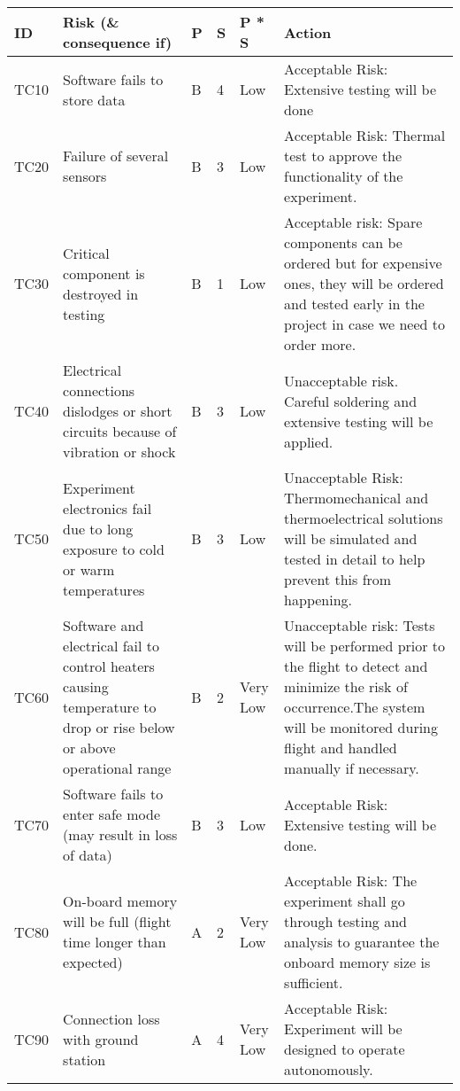 \begin{longtable}{|m{}| m{} |m{} |m{}|m{}| m{}|}

\hline
\textbf{ID} & \textbf{Risk (\& consequence if)} & \textbf{P} & \textbf{S} & \textbf{P * S} & \textbf{Action} \\ \hline
TC10 & Software fails to store data & B & 4 & \cellcolor[HTML]{FCFF2F}Low & Acceptable Risk: Extensive testing will be done \\ \hline
TC20 & Failure of several sensors & B & 3 & \cellcolor[HTML]{FCFF2F}Low & Acceptable Risk: Thermal test to approve the functionality of the experiment. \\ \hline
TC30 & Critical component is destroyed in testing & B & 1 & \cellcolor[HTML]{FCFF2F}Low & Acceptable risk: Spare components can be ordered but for expensive ones, they will be ordered and tested early in the project in case we need to order more. \\ \hline
TC40 & Electrical connections dislodges or short circuits because of vibration or shock & B & 3 & \cellcolor[HTML]{FCFF2F}Low & Unacceptable risk. Careful soldering and extensive testing will be applied. \\ \hline
TC50 & Experiment electronics fail due to long exposure to cold or warm temperatures & B & 3 & \cellcolor[HTML]{FCFF2F}Low & Unacceptable Risk: Thermomechanical and thermoelectrical solutions will be simulated and tested in detail to help prevent this from happening. \\ \hline
TC60 & Software and electrical fail to control heaters causing temperature to drop or rise below or above operational range & B & 2 & \cellcolor[HTML]{34FF34}Very Low & Unacceptable risk: Tests will be performed prior to the flight to detect and minimize the risk of occurrence.The system will be monitored during flight and handled manually if necessary. \\ \hline
TC70 & Software fails to enter safe mode (may result in loss of data) & B & 3 & \cellcolor[HTML]{FCFF2F}Low & Acceptable Risk: Extensive testing will be done. \\ \hline
TC80 & On-board memory will be full (flight time longer than expected) & A & 2 & \cellcolor[HTML]{34FF34}Very Low & Acceptable Risk: The experiment shall go through testing and analysis to guarantee the onboard memory size is sufficient.\\ \hline
TC90 & Connection loss with ground station & A & 4 & \cellcolor[HTML]{34FF34}Very Low & Acceptable Risk: Experiment will be designed to operate autonomously. \\ \hline

\end{longtable}

